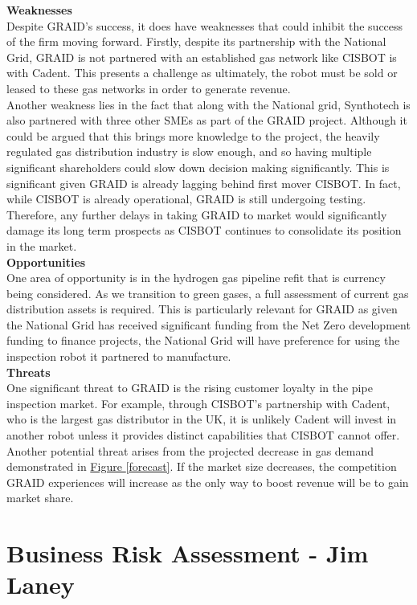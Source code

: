 \documentclass[11pt]{article}		%
\newcommand{\figref}[1]{\hyperref[#1]{Figure \ref*{#1}}}    %
\begin{document}
	        \textbf{Weaknesses}\\
	        Despite GRAID’s success, it does have weaknesses that could inhibit the success of the firm moving forward. Firstly, despite its partnership with the National Grid, GRAID is not partnered with an established gas network like CISBOT is with Cadent. This presents a challenge as ultimately, the robot must be sold or leased to these gas networks in order to generate revenue. \\
	        \hspace*{3ex}Another weakness lies in the fact that along with the National grid, Synthotech is also partnered with three other SMEs as part of the GRAID project. Although it could be argued that this brings more knowledge to the project, the heavily regulated gas distribution industry is slow enough, and so having multiple significant shareholders could slow down decision making significantly. This is significant given GRAID is already lagging behind first mover CISBOT. In fact, while CISBOT is already operational, GRAID is still undergoing testing. Therefore, any further delays in taking GRAID to market would significantly damage its long term prospects as CISBOT continues to consolidate its position in the market. \\
	        \textbf{Opportunities}\\
	        One area of opportunity is in the hydrogen gas pipeline refit that is currency being considered. As we transition to green gases, a full assessment of current gas distribution assets is required. This is particularly relevant for GRAID as given the National Grid has received significant funding from the Net Zero development funding to finance projects, the National Grid will have preference for using the inspection robot it partnered to manufacture. \\
	        \textbf{Threats} \\
	        One significant threat to GRAID is the rising customer loyalty in the pipe inspection market. For example, through CISBOT's partnership with Cadent, who is the largest gas distributor in the UK, it is unlikely Cadent will invest in another robot unless it provides distinct capabilities that CISBOT cannot offer. Another potential threat arises from the projected decrease in gas demand demonstrated in \figref{forecast}. If the market size decreases, the competition GRAID experiences will increase as the only way to boost revenue will be to gain market share.
	        
     \section[Business Risk Assessment]{Business Risk Assessment - Jim Laney}
     	
\end{document}
